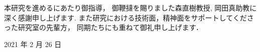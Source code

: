 \newpage
\changeindent{0cm}
\acknowledgements
\changeindent{2cm}

本研究を進めるにあたり御指導， 御鞭撻を賜りました森直樹教授,
岡田真助教に深く感謝申し上げます.
また研究における技術面，精神面をサポートしてくださった研究室の先輩方，
同期たちにも重ねて御礼申し上げます．


\begin{flushright}
	2021 年 2 月 26 日
\end{flushright}
